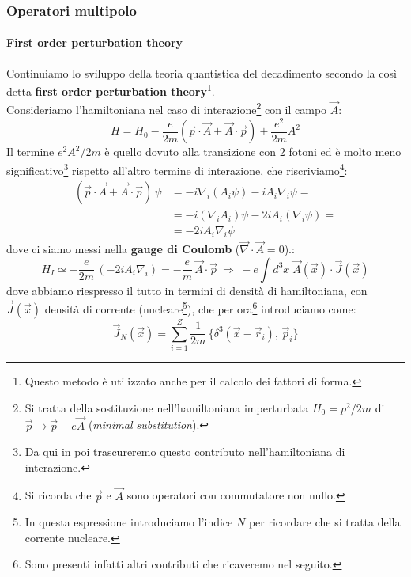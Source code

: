 \subsubsection{Operatori multipolo}
\paragraph{First order perturbation theory}\label{sec-first-order} Continuiamo lo sviluppo della teoria quantistica del decadimento secondo la così detta \textbf{first order perturbation theory}\footnote{Questo metodo è utilizzato anche per il calcolo dei fattori di forma.}.\\
Consideriamo l'hamiltoniana nel caso di interazione\footnote{Si tratta della sostituzione nell'hamiltoniana imperturbata $H_0 = p^2/2m$ di  $\vec{p}\to\vec{p}-e\vec{A}$ (\textit{minimal substitution}).} con il campo $\vec{A}$:
$$H = H_0 - \frac{e}{2m}(\vec{p}\cdot\vec{A}+\vec{A}\cdot\vec{p})+\frac{e^2}{2m}A^2$$
Il termine $e^2A^2/2m$ è quello dovuto alla transizione con 2 fotoni ed è molto meno significativo\footnote{Da qui in poi trascureremo questo contributo nell'hamiltoniana di interazione.} rispetto all'altro termine di interazione, che riscriviamo\footnote{Si ricorda che $\vec{p}$ e $\vec{A}$ sono operatori con commutatore non nullo.}:
\begin{displaymath}
\begin{aligned}
(\vec{p}\cdot\vec{A}+\vec{A}\cdot\vec{p}) \,\psi &= -i\nabla_i (A_i\psi) - i A_i \nabla_i \psi = \\
&= -i (\nabla_i A_i )\psi - 2i A_i (\nabla_i\psi) = \\
&= -2i A_i \nabla_i \psi
\end{aligned}
\end{displaymath}
dove ci siamo messi nella \textbf{gauge di Coulomb} ($\vec{\nabla}\cdot\vec{A}=0$).:
$$H_I \simeq - \frac{e}{2m}\,(-2iA_i\nabla_i) = -\frac{e}{m}\, \vec{A}\cdot\vec{p}\:\Rightarrow\: -e \int d^3x \; \vec{A}(\vec{x})\cdot \vec{J}(\vec{x})$$
dove abbiamo riespresso il tutto in termini di densità di hamiltoniana, con $\vec{J}(\vec{x})$ densità di corrente (nucleare\footnote{In questa espressione introduciamo l'indice $N$ per ricordare che si tratta della corrente nucleare.}), che per ora\footnote{Sono presenti infatti altri contributi che ricaveremo nel seguito.} introduciamo come:
$$\vec{J}_N (\vec{x}) = \sum_{i=1}^Z \frac{1}{2m}\,\Biggl \{ \delta^3(\vec{x}-\vec{r}_i),\, \vec{p}_i \Biggr \}$$
